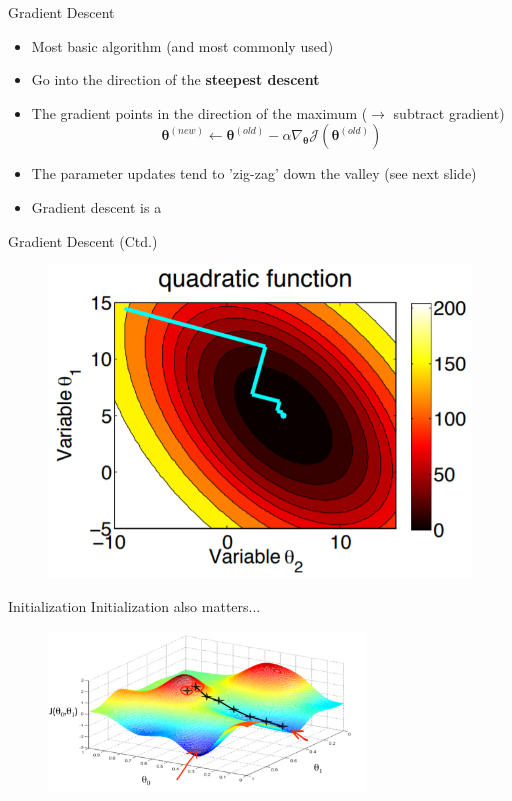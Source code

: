 \begin{frame}{Gradient Descent}{}
	\begin{itemize}
		\item Most basic algorithm (and most commonly used)
		\item Go into the direction of the \textbf{steepest descent}
		\item The gradient points in the direction of the maximum ($\rightarrow$ subtract gradient)
		\begin{equation}
			\bm{\theta}^{(new)} \longleftarrow \bm{\theta}^{(old)} -
				\alpha \nabla_{\bm{\theta}} \mathcal{J}(\bm{\theta}^{(old)})
		\end{equation}
		\item The parameter updates tend to 'zig-zag' down the valley (see next slide)
		\item Gradient descent is a 
	\end{itemize}
\end{frame}


\begin{frame}{Gradient Descent (Ctd.)}{}
	\begin{figure}
		\centering
		\includegraphics[scale=0.45]{02_math/02_img/gradient_descent}
	\end{figure}
\end{frame}


\begin{frame}{Initialization}{}
	Initialization also matters...
	\begin{figure}
		\centering
		\includegraphics[width=0.75\textwidth]{02_math/02_img/gradientascent}
	\end{figure}
\end{frame}


